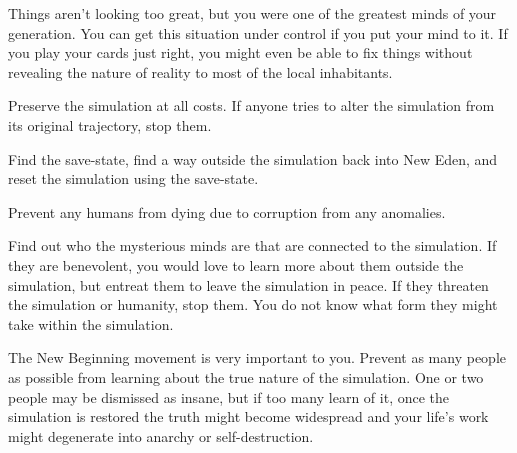 \documentclass[char]{guildcamp1}
\begin{document}
Things aren't looking too great, but you were one of the greatest minds of your generation. You can get this situation under control if you put your mind to it. If you play your cards just right, you might even be able to fix things without revealing the nature of reality to most of the local inhabitants.

\begin{itemz}[Goals]
  \item Preserve the simulation at all costs. If anyone tries to alter the simulation from its original trajectory, stop them.
  \item Find the save-state, find a way outside the simulation back into New Eden, and reset the simulation using the save-state.
  \item Prevent any humans from dying due to corruption from any anomalies.
  \item Find out who the mysterious minds are that are connected to the simulation. If they are benevolent, you would love to learn more about them outside the simulation, but entreat them to leave the simulation in peace. If they threaten the simulation or humanity, stop them. You do not know what form they might take within the simulation.
  \item The New Beginning movement is very important to you. Prevent as many people as possible from learning about the true nature of the simulation. One or two people may be dismissed as insane, but if too many learn of it, once the simulation is restored the truth might become widespread and your life's work might degenerate into anarchy or self-destruction.
\end{itemz}



\end{document}
